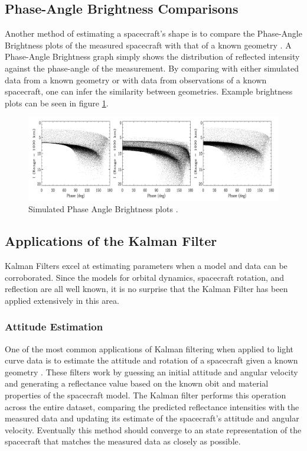 \documentclass{article}
\begin{document}
\subsection{Phase-Angle Brightness Comparisons}

Another method of estimating a spacecraft's shape is to compare the Phase-Angle Brightness plots of the measured spacecraft with that of a known geometry \cite{Separating}. A Phase-Angle Brightness graph simply shows the distribution of reflected intensity against the phase-angle of the measurement. By comparing with either simulated data from a known geometry or with data from observations of a known spacecraft, one can infer the similarity between geometries. Example brightness plots can be seen in figure \ref{phase_angle_bright_im}.

\begin{figure}[h]
	\centering
	\includegraphics[width=\textwidth]{phase_angle_brightness_SEPARATING_ATTITUDE}
	\caption{Simulated Phase Angle Brightness plots \cite{Separating}.}
	\label{phase_angle_bright_im}
\end{figure}

\subsection{Applications of the Kalman Filter}

Kalman Filters excel at estimating parameters when a model and data can be corroborated. Since the models for orbital dynamics, spacecraft rotation, and reflection are all well known, it is no surprise that the Kalman Filter has been applied extensively in this area.

\subsubsection{Attitude Estimation}
One of the most common applications of Kalman filtering when applied to light curve data is to estimate the attitude and rotation of a spacecraft given a known geometry \cite{AttitudeEstimationFromLightCurve} \cite{LINARES20141} \cite{SpaceObjectCharacterization}. These filters work by guessing an initial attitude and angular velocity and generating a reflectance value based on the known obit and material properties of the spacecraft model. The Kalman filter performs this operation across the entire dataset, comparing the predicted reflectance intensities with the measured data and updating its estimate of the spacecraft's attitude and angular velocity. Eventually this method should converge to an state representation of the spacecraft that matches the measured data as closely as possible.
\end{document}
